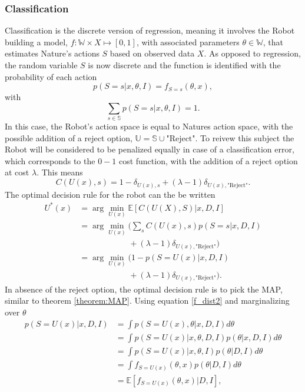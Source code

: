 	
	\subsubsection{Classification}
	\label{sec:baycl}
	Classification is the discrete version of regression, meaning it involves the Robot building a model, $f: \mathbb{W}\times X\mapsto[0,1]$, with associated parameters $\theta\in \mathbb{W}$, that estimates Nature's actions $S$ based on observed data $X$. As opposed to regression, the random variable $S$ is now discrete and the function is identified with the probability of each action
	\begin{equation}
		p(S = s|x,\theta,I)= f_{S = s}(\theta,x),
		\label{f_dist2}
	\end{equation}
	with
	\begin{equation}
		\sum_{s\in\mathbb{S}} p(S = s|x,\theta,I) = 1.
	\end{equation}
	In this case, the Robot's action space is equal to Natures action space, with the possible addition of a reject option, $\mathbb{U}=\mathbb{S}\cup \text{"Reject"}$. To reivew this subject the Robot will be considered to be penalized equally in case of a classification error, which corresponds to the $0-1$ cost function, with the addition of a reject option at cost $\lambda$. This means
	\begin{equation}
		C(U(x),s) = 1- \delta_{U(x),s}+(\lambda-1)\delta_{U(x),\text{"Reject"}}.
	\end{equation}
	The optimal decision rule for the robot can the be written
	\begin{equation}
		\begin{split}
			U^*(x) & = \arg\min_{U(x)}\mathbb{E}[C(U(X), S)|x,D,I]\\
			 &= \arg\min_{U(x)}\bigg(\sum_{s}C(U(x),s)p(S = s|x,D,I)\\
			 &\qquad\qquad\qquad+(\lambda-1)\delta_{U(x),\text{"Reject"}}\bigg)\\
			& = \arg\min_{U(x)}\bigg(1- p(S=U(x)|x,D,I)\\
			&\qquad\qquad\qquad+(\lambda-1)\delta_{U(x),\text{"Reject"}}\bigg).
		\end{split}
		\label{eq:expected_cost1}
	\end{equation}
	In absence of the reject option, the optimal decision rule is to pick the MAP, similar to theorem \ref{theorem:MAP}. Using equation \eqref{f_dist2} and marginalizing over $\theta$
	\begin{equation}
		\begin{split}
			p(S= U(x)|x,D,I) &= \int p(S = U(x),\theta|x,D,I) d\theta \\
			& = \int p(S = U(x)|x,\theta,D,I)  p(\theta|x,D,I)d\theta \\
			& = \int p(S = U(x)|x,\theta,I)  p(\theta|D,I)d\theta \\
			& = \int f_{S = U(x)}(\theta,x)  p(\theta|D,I)d\theta \\
			& = \mathbb{E}[f_{S = U(x)}(\theta,x)|D,I],\\
		\end{split}
		\label{eq:q5}
	\end{equation}
